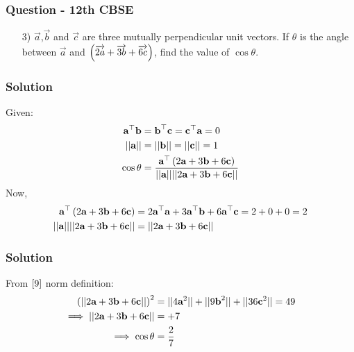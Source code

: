 \documentclass{beamer}
\begin{document}
\begin{frame}
\frametitle{Question - 12th CBSE}
\begin{enumerate}
    \item [3)]
$\overrightarrow{a}$,$\overrightarrow{b}$ and $\overrightarrow{c}$ are three mutually perpendicular unit vectors. If $\theta$ is the angle between $\overrightarrow{a}$ and $\left(\overrightarrow{2a}+\overrightarrow{3b}+\overrightarrow{6c}\right)$, find the value of $\cos{\theta}$. 
\end{enumerate}
\end{frame}





\begin{frame}
\frametitle{Solution}
Given:
\begin{align}
    \textbf{a}^{\top}\textbf{b} &=  \textbf{b}^{\top}\textbf{c} =  \textbf{c}^{\top}\textbf{a} = 0\\
    \lvert \lvert \textbf{a} \rvert \rvert 
&= \lvert \lvert \textbf{b} \rvert \rvert = \lvert \lvert \textbf{c} \rvert \rvert = 1\\
\cos{\theta} &= \frac{\textbf{a}^{\top}\left(2\textbf{a}+3\textbf{b}+6\textbf{c}\right)}{\lvert \lvert \textbf{a} \rvert \rvert \lvert \lvert 2\textbf{a} + 3\textbf{b} + 6\textbf{c} \rvert \rvert}
\end{align}
Now,
\begin{align}
    \textbf{a}^{\top}\left(2\textbf{a}+3\textbf{b}+6\textbf{c}\right) &= 2\textbf{a}^{\top}\textbf{a} + 3\textbf{a}^{\top}\textbf{b} + 6\textbf{a}^{\top}\textbf{c} = 2 + 0 + 0 = 2\\
    \lvert \lvert \textbf{a} \rvert \rvert \lvert \lvert 2\textbf{a} + 3\textbf{b} + 6\textbf{c} \rvert \rvert &= \lvert \lvert 2\textbf{a} + 3\textbf{b} + 6\textbf{c} \rvert \rvert
    \end{align}
\end{frame}









\begin{frame}
\frametitle{Solution}
From $\eqref{9}$ norm definition:
    \begin{align}
        \left(\lvert \lvert 2\textbf{a} + 3\textbf{b} + 6\textbf{c} \rvert \rvert\right)^2 &= \lvert \lvert 4\textbf{a}^2 \rvert \rvert + \lvert \lvert 9\textbf{b}^2 \rvert \rvert + \lvert \lvert 36\textbf{c}^2  \rvert \rvert = 49\\
    \implies \lvert \lvert 2\textbf{a} + 3\textbf{b} + 6\textbf{c} \rvert \rvert &= +7\\
    \implies \cos{\theta} &= \dfrac{2}{7}
\end{align}
    
\end{frame}
\end{document}
